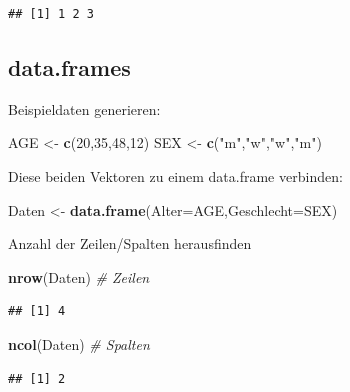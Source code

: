 \documentclass[]{article}
\newenvironment{Shaded}{\begin{snugshade}}{\end{snugshade}}
\newcommand{\KeywordTok}[1]{\textcolor[rgb]{0.13,0.29,0.53}{\textbf{{#1}}}}
\newcommand{\DataTypeTok}[1]{\textcolor[rgb]{0.13,0.29,0.53}{{#1}}}
\newcommand{\DecValTok}[1]{\textcolor[rgb]{0.00,0.00,0.81}{{#1}}}
\newcommand{\StringTok}[1]{\textcolor[rgb]{0.31,0.60,0.02}{{#1}}}
\newcommand{\CommentTok}[1]{\textcolor[rgb]{0.56,0.35,0.01}{\textit{{#1}}}}
\newcommand{\NormalTok}[1]{{#1}}
\begin{document}
\begin{verbatim}
## [1] 1 2 3
\end{verbatim}

\subsection{data.frames}\label{data.frames}

Beispieldaten generieren:

\begin{Shaded}
\begin{Highlighting}[]
\NormalTok{AGE <-}\StringTok{ }\KeywordTok{c}\NormalTok{(}\DecValTok{20}\NormalTok{,}\DecValTok{35}\NormalTok{,}\DecValTok{48}\NormalTok{,}\DecValTok{12}\NormalTok{)}
\NormalTok{SEX <-}\StringTok{ }\KeywordTok{c}\NormalTok{(}\StringTok{"m"}\NormalTok{,}\StringTok{"w"}\NormalTok{,}\StringTok{"w"}\NormalTok{,}\StringTok{"m"}\NormalTok{)}
\end{Highlighting}
\end{Shaded}

Diese beiden Vektoren zu einem data.frame verbinden:

\begin{Shaded}
\begin{Highlighting}[]
\NormalTok{Daten <-}\StringTok{ }\KeywordTok{data.frame}\NormalTok{(}\DataTypeTok{Alter=}\NormalTok{AGE,}\DataTypeTok{Geschlecht=}\NormalTok{SEX)}
\end{Highlighting}
\end{Shaded}

Anzahl der Zeilen/Spalten herausfinden

\begin{Shaded}
\begin{Highlighting}[]
\KeywordTok{nrow}\NormalTok{(Daten) }\CommentTok{# Zeilen}
\end{Highlighting}
\end{Shaded}

\begin{verbatim}
## [1] 4
\end{verbatim}

\begin{Shaded}
\begin{Highlighting}[]
\KeywordTok{ncol}\NormalTok{(Daten) }\CommentTok{# Spalten}
\end{Highlighting}
\end{Shaded}

\begin{verbatim}
## [1] 2
\end{verbatim}
\end{document}
